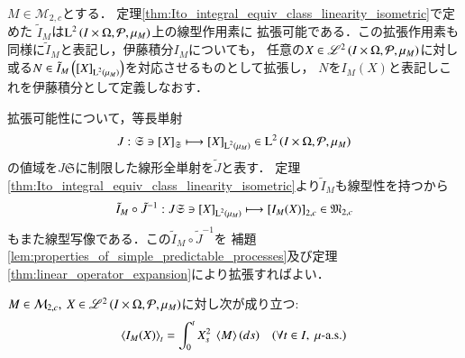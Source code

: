 	\begin{screen}
		\begin{thm}[伊藤積分の拡張]
			$M \in \mathcal{M}_{2,c}$とする．
			定理\ref{thm:Ito_integral_equiv_class_linearity_isometric}で定めた
			$\tilde{I}_M$は$\operatorname{L}^{2} \left(I \times \Omega,\mathcal{P},\mu_M\right)$上の線型作用素に
			拡張可能である．この拡張作用素も同様に$\tilde{I}_M$と表記し，伊藤積分$I_M$についても，
			任意の$X \in \mathscr{L}^{2} \left(I \times \Omega,\mathcal{P},\mu_M\right)$に対し
			或る$N \in \tilde{I}_M\left( \left[X\right]_{\operatorname{L}^{2} \left(\mu_M\right)} \right)$を対応させるものとして拡張し，
			$N$を$I_M(X)$と表記しこれを伊藤積分として定義しなおす．
		\end{thm}
	\end{screen}
	
	\begin{prf}
		拡張可能性について，等長単射
		\begin{align}
			J:\mathfrak{S} \ni \left[X\right]_{\mathfrak{S}} \longmapsto \left[X\right]_{\operatorname{L}^{2} \left(\mu_M\right)} \in \operatorname{L}^{2} \left(I \times \Omega,\mathcal{P},\mu_M\right)
		\end{align}
		の値域を$J\mathfrak{S}$に制限した線形全単射を$\tilde{J}$と表す．
		定理\ref{thm:Ito_integral_equiv_class_linearity_isometric}より$\tilde{I}_M$も線型性を持つから
		\begin{align}
			\tilde{I}_M \circ \tilde{J}^{-1}: J \mathfrak{S} \ni \left[X\right]_{\operatorname{L}^{2} \left(\mu_M\right)} \longmapsto \left[I_M(X)\right]_{2,c} \in \mathfrak{M}_{2,c}
		\end{align}
		もまた線型写像である．この$\tilde{I}_M \circ \tilde{J}^{-1}$を
		補題\ref{lem:properties_of_simple_predictable_processes}及び定理\ref{thm:linear_operator_expansion}により拡張すればよい．
		\QED
	\end{prf}
	
	\begin{screen}
		\begin{prp}[伊藤積分の二次変分]
			$M \in \mathcal{M}_{2,c},\ X \in \mathscr{L}^{2} \left(I \times \Omega,\mathcal{P},\mu_M\right)$に対し次が成り立つ:
			\begin{align}
				\inprod<I_M(X)>_t = \int_0^t X_s^2\ \inprod<M>(ds)
				\quad (\forall t \in I,\ \mbox{$\mu$-a.s.})
			\end{align}
		\end{prp}
	\end{screen}
